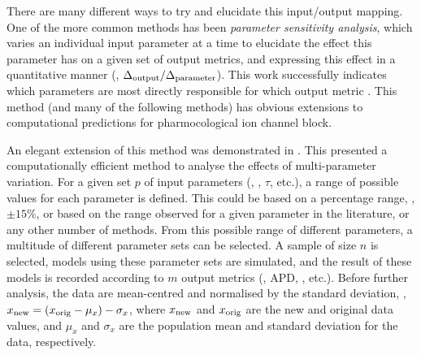 \documentclass[../thesis-main.tex]{subfiles}
\begin{document}
 There are many different ways to try and elucidate this input/output mapping. One of the more common methods has been \emph{parameter sensitivity analysis}, which varies an individual input parameter at a time to elucidate the effect this parameter has on a given set of output metrics, and expressing this effect in a quantitative manner (\idest{}, $\Delta_\textnormal{output}/\Delta_\textnormal{parameter}$). This work successfully indicates which parameters are most directly responsible for which output metric \citep{Nygren1998, Romero2009, Romero2010, Corrias2011, Romero2011}. This method (and many of the following methods) has obvious extensions to computational predictions for pharmocological ion channel block.
 
 An elegant extension of this method was demonstrated in \citet{Sobie2009}. This presented a computationally efficient method to analyse the effects of multi-parameter variation. For a given set $p$ of input parameters (\eg{}, \gnak{}, $\tau$, etc.), a range of possible values for each parameter is defined. This could be based on a percentage range, \eg{}, $\pm15\%$, or based on the range observed for a given parameter in the literature, or any other number of methods. From this possible range of different parameters, a multitude of different parameter sets can be selected. A sample of size $n$ is selected, models using these parameter sets are simulated, and the result of these models is recorded according to $m$ output metrics (\eg{}, APD, \casys{}, etc.). Before further analysis, the data are mean-centred and normalised by the standard deviation, \idest{}, $x_\textnormal{new} = (x_\textnormal{orig}-\mu_x)-\sigma_x$, where $x_\textnormal{new}$ and $x_\textnormal{orig}$ are the new and original data values, and $\mu_x$ and $\sigma_x$ are the population mean and standard deviation for the data, respectively.
 
\end{document}
